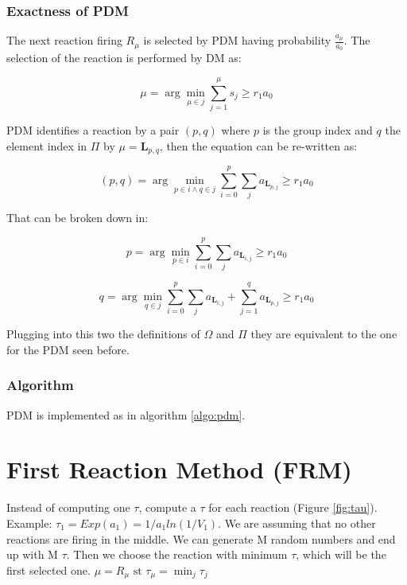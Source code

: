     \subsubsection{Exactness of PDM}
    The next reaction firing $R_\mu$ is selected by PDM having probability $\frac{a_\mu}{a_0}$.
    The selection of the reaction is performed by DM as:

    $$\mu = \arg\min\limits_{\mu\in j}\sum\limits_{j=1}^\mu s_j\ge r_1a_0$$

    PDM identifies a reaction by a pair $(p,q)$ where $p$ is the group index and $q$ the element index in $\Pi$ by $\mu = \mathbf{L}_{p,q}$, then the equation can be re-written as:

    $$(p,q) = \arg\min_{p\in i\land q\in j}\sum\limits_{i=0}^p\sum\limits_{j}a_{\mathbf{L}_{p,j}}\ge r_1 a_0$$

    That can be broken down in:

    $$p = \arg\min\limits_{p\in i}\sum\limits_{i=0}^p\sum\limits_j a_{\mathbf{L}_{i, j}}\ge r_1a_0$$

    $$q = \arg\min\limits_{q\in j}\sum\limits_{i=0}^p\sum\limits_j a_{\mathbf{L}_{i, j}} + \sum\limits_{j=1}^q a_{\mathbf{L}_{p,j}}\ge r_1 a_0$$

    Plugging into this two the definitions of $\Omega$ and $\Pi$ they are equivalent to the one for the PDM seen before.

    \subsubsection{Algorithm}
    PDM is implemented as in algorithm \ref{algo:pdm}.

    



























\section{First Reaction Method (FRM)}
Instead of computing one $\tau$, compute a $\tau$ for each reaction (Figure \ref{fig:tau}).
Example: $\tau_1 = Exp(a_1)=1/a_1ln(1/V_1)$.
We are assuming that no other reactions are firing in the middle.
We can generate M random numbers and end up with M $\tau$.
Then we choose the reaction with minimum $\tau$, which will be the first selected one.
$\mu= R_{\mu}\text{ st }\tau_{\mu}= \min_{j}\tau_j$

